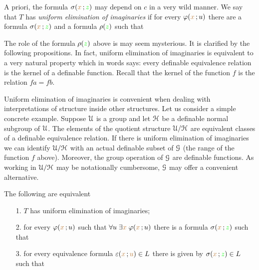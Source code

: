 \documentclass[creche.tex]{subfiles}
\begin{document}

A priori, the formula $\sigma({\color{brown} x}\,;{\color{green} z})$ may depend on $c$ in a very wild manner. We say that $T$ has \emph{uniform elimination of imaginaries\/} if for every $\varphi({\color{brown} x}\,;u)$ there are a formula $\sigma({\color{brown} x}\,;{\color{green} z})$ and a formula $\rho({\color{green} z})$ such that 


The role of the formula $\rho({\color{green} z})$ above is may seem mysterious. It is clarified by the following propositions. In fact, uniform elimination of imaginaries is equivalent to a very natural property which in words says: every definable equivalence relation is the kernel of a definable function. Recall that the kernel of the function $f$ is the relation $fa=fb$.

Uniform elimination of imaginaries is convenient when dealing with interpretations of structure inside other structures. Let us consider a simple concrete example. Suppose $\EuScript U$ is a group and let $\EuScript H$ be a definable normal subgroup of $\EuScript U$. The elements of the quotient structure $\EuScript U/\EuScript H$ are equivalent classes of a definable equivalence relation. If there is uniform elimination of imaginaries we can identify $\EuScript U/\EuScript H$ with an actual definable subset of $\EuScript G$ (the range of the function $f$ above). Moreover, the group operation of $\EuScript G$ are definable functions. As working in $\EuScript U/\EuScript H$ may be notationally cumbersome, $\EuScript G$ may offer a convenient alternative.

\begin{proposition}\label{prop_uei_standard}
The following are equivalent
\begin{itemize}
\item[1.] $T$ has uniform elimination of imaginaries;
\end{itemize}
\begin{itemize}
\item[2.] for every $\varphi({\color{brown} x}\,;u)$ such that  $\forall u\;\exists{\color{brown}x}\;\varphi({\color{brown} x}\,;u)$ there is a formula $\sigma({\color{brown} x}\,;{\color{green} z})$ such that 
\end{itemize}


\begin{itemize}
\item[3.] for every equivalence formula $\varepsilon({\color{brown} x}\,;{\color{brown} u})\in L$ there is given by $\sigma({\color{brown} x}\,;{\color{green} z})\in L$ such that
\end{itemize}



\end{proposition}
\end{document}
